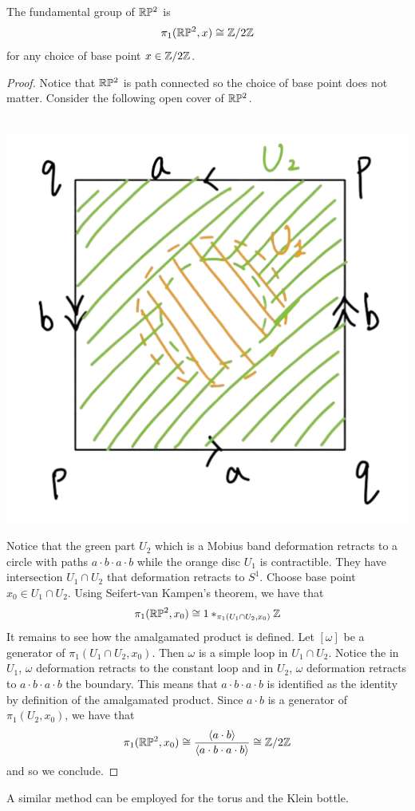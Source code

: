 \documentclass[a4paper]{article}
\begin{document}
\begin{thm}{}{} The fundamental group of $\mathbb{R}\mathbb{P}^2$ is $$\pi_1(\mathbb{R}\mathbb{P}^2,x)\cong\mathbb{Z}/2\mathbb{Z}$$ for any choice of base point $x\in\mathbb{Z}/2\mathbb{Z}$. \tcbline
\begin{proof}
Notice that $\mathbb{R}\mathbb{P}^2$ is path connected so the choice of base point does not matter. Consider the following open cover of $\mathbb{R}\mathbb{P}^2$. \\~\\

\begin{center}
\includegraphics[scale = 0.3]{Image 1}
\end{center}

Notice that the green part $U_2$ which is a Mobius band deformation retracts to a circle with paths $a\cdot b\cdot a\cdot b$ while the orange disc $U_1$ is contractible. They have intersection $U_1\cap U_2$ that deformation retracts to $S^1$. Choose base point $x_0\in U_1\cap U_2$. Using Seifert-van Kampen's theorem, we have that $$\pi_1(\mathbb{R}\mathbb{P}^2,x_0)\cong1\ast_{\pi_1(U_1\cap U_2,x_0)}\mathbb{Z}$$ It remains to see how the amalgamated product is defined. Let $[\omega]$ be a generator of $\pi_1(U_1\cap U_2,x_0)$. Then $\omega$ is a simple loop in $U_1\cap U_2$. Notice the in $U_1$, $\omega$ deformation retracts to the constant loop and in $U_2$, $\omega$ deformation retracts to $a\cdot b\cdot a\cdot b$ the boundary. This means that $a\cdot b\cdot a\cdot b$ is identified as the identity by definition of the amalgamated product. Since $a\cdot b$ is a generator of $\pi_1(U_2,x_0)$, we have that $$\pi_1(\mathbb{R}\mathbb{P}^2,x_0)\cong\frac{\langle a\cdot b\rangle}{\langle a\cdot b\cdot a\cdot b\rangle}\cong\mathbb{Z}/2\mathbb{Z}$$ and so we conclude. 
\end{proof}
\end{thm}

A similar method can be employed for the torus and the Klein bottle. 
\end{document}
